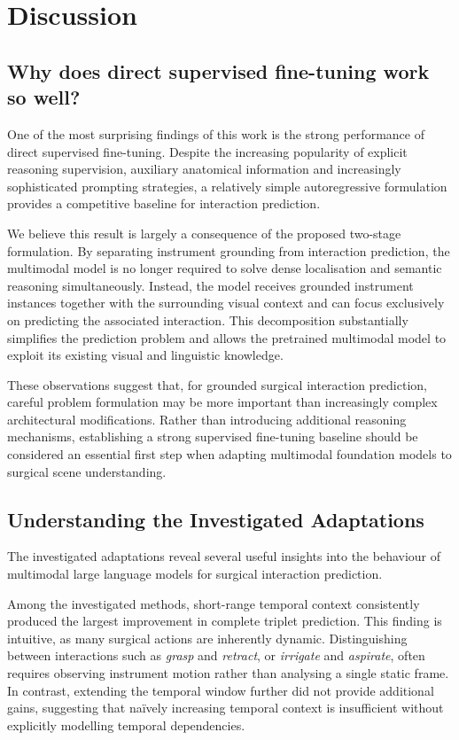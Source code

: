 \documentclass[11pt]{article}
\begin{document}
\section{Discussion}
\subsection{Why does direct supervised fine-tuning work so well?}

One of the most surprising findings of this work is the strong performance of direct supervised fine-tuning. Despite the increasing popularity of explicit reasoning supervision, auxiliary anatomical information and increasingly sophisticated prompting strategies, a relatively simple autoregressive formulation provides a competitive baseline for interaction prediction.

We believe this result is largely a consequence of the proposed two-stage formulation. By separating instrument grounding from interaction prediction, the multimodal model is no longer required to solve dense localisation and semantic reasoning simultaneously. Instead, the model receives grounded instrument instances together with the surrounding visual context and can focus exclusively on predicting the associated interaction. This decomposition substantially simplifies the prediction problem and allows the pretrained multimodal model to exploit its existing visual and linguistic knowledge.

These observations suggest that, for grounded surgical interaction prediction, careful problem formulation may be more important than increasingly complex architectural modifications. Rather than introducing additional reasoning mechanisms, establishing a strong supervised fine-tuning baseline should be considered an essential first step when adapting multimodal foundation models to surgical scene understanding.

\subsection{Understanding the Investigated Adaptations}

The investigated adaptations reveal several useful insights into the behaviour of multimodal large language models for surgical interaction prediction.

Among the investigated methods, short-range temporal context consistently produced the largest improvement in complete triplet prediction. This finding is intuitive, as many surgical actions are inherently dynamic. Distinguishing between interactions such as \textit{grasp} and \textit{retract}, or \textit{irrigate} and \textit{aspirate}, often requires observing instrument motion rather than analysing a single static frame. In contrast, extending the temporal window further did not provide additional gains, suggesting that naïvely increasing temporal context is insufficient without explicitly modelling temporal dependencies.
\end{document}
